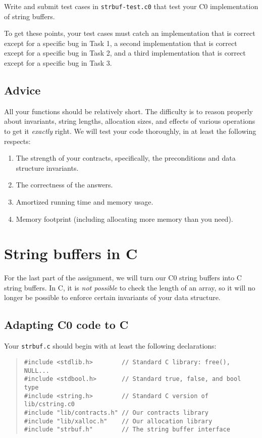 \documentclass[12pt]{exam}
\begin{document}
\begin{task}[4]
  Write and submit test cases in \lstinline'strbuf-test.c0' that test
  your C0 implementation of string buffers.
\end{task}

To get these points, your test cases must catch an
implementation that is correct except for a specific bug in Task 1, a
second implementation that is correct except for a specific bug in
Task 2, and a third implementation that is correct except for a
specific bug in Task 3.


\subsection{Advice}

All your functions should be relatively short.  The difficulty is to
reason properly about invariants, string lengths, allocation sizes,
and effects of various operations to get it \emph{exactly} right.  We
will test your code thoroughly, in at least the following respects:
\begin{enumerate}
\item%
  The strength of your contracts, specifically, the preconditions and
  data structure invariants.
\item%
  The correctness of the answers.
\item%
  Amortized running time and memory usage.
\item%
  Memory footprint (including allocating more memory than you need).
\end{enumerate}


\section{String buffers in C}

For the last part of the assignment, we will turn our C0 string
buffers into C string buffers. In C, it is \emph{not possible} to
check the length of an array, so it will no longer be possible to
enforce certain invariants of your data structure.

\subsection{Adapting C0 code to C}

Your \lstinline'strbuf.c' should begin with at least the following declarations:

\begin{quote}
\begin{lstlisting}[deletekeywords={string}]
#include <stdlib.h>        // Standard C library: free(), NULL...
#include <stdbool.h>       // Standard true, false, and bool type
#include <string.h>        // Standard C version of lib/cstring.c0
#include "lib/contracts.h" // Our contracts library
#include "lib/xalloc.h"    // Our allocation library
#include "strbuf.h"        // The string buffer interface
\end{lstlisting}
\end{quote}
\end{document}
